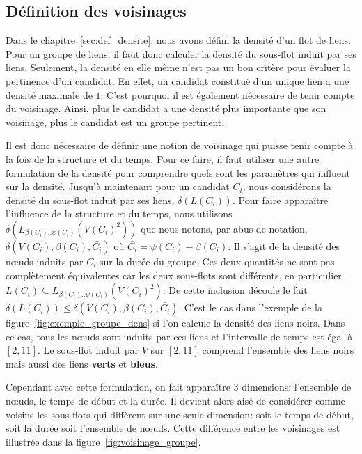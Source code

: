 \subsection{Définition des voisinages}
Dans le chapitre~\ref{sec:def_densite}, nous avons défini la densité d'un flot de liens.
Pour un groupe de liens, il faut donc calculer la densité du sous-flot induit par ses liens.
Seulement, la densité en elle même n'est pas un bon critère pour évaluer la pertinence d'un candidat.
En effet, un candidat constitué d'un unique lien a une densité maximale de $1$.
C'est pourquoi il est également nécessaire de tenir compte du voisinage.
Ainsi, plus le candidat a une densité plus importante que son voisinage, plus le candidat est un groupe pertinent.

Il est donc nécessaire de définir une notion de voisinage qui puisse tenir compte à la fois de la structure et du temps.
Pour ce faire, il faut utiliser une autre formulation de la densité pour comprendre quels sont les paramètres qui influent sur la densité.
Jusqu'à maintenant pour un candidat $C_i$, nous considérons la densité du sous-flot induit par ses liens, $\delta(L(C_i))$.
Pour faire apparaître l'influence de la structure et du temps, nous utilisons $\delta(L_{\beta(C_i)..\psi(C_i)}(V(C_i)^2))$ que nous notons, par abus de notation, $\delta(V(C_i),\beta(C_i), \bar{C_i})$ où $\bar{C_i} = \psi(C_i)-\beta(C_i)$.
Il s'agit de la densité des n\oe{}uds induits par $C_i$ sur la durée du groupe.
Ces deux quantités ne sont pas complètement équivalentes car les deux sous-flots sont différents, en particulier $L(C_i) \subseteq L_{\beta(C_i)..\psi(C_i)}(V(C_i)^2)$.
De cette inclusion découle le fait $\delta(L(C_i)) \leq \delta(V(C_i),\beta(C_i), \bar{C_i})$.
C'est le cas dans l'exemple de la figure~\ref{fig:exemple_groupe_dens} si l'on calcule la densité des liens noirs.
Dans ce cas,  tous les n\oe{}uds sont induits par ces liens et l'intervalle de temps est égal à $[2,11]$.
Le sous-flot induit par $V$ sur $[2,11]$ comprend l'ensemble des liens noirs mais aussi des liens \textcolor{vert_turquoise}{\textbf{verts}} et \textcolor{bleu_window}{\textbf{bleus}}.


Cependant avec cette formulation, on fait apparaître 3 dimensions: l'ensemble de n\oe{}uds, le temps de début et la durée.
Il devient alors aisé de considérer comme voisins les sous-flots qui diffèrent sur une seule dimension: soit le temps de début, soit la durée soit l'ensemble de n\oe{}uds.
Cette différence entre les voisinages est illustrée dans la figure~\ref{fig:voisinage_groupe}.

